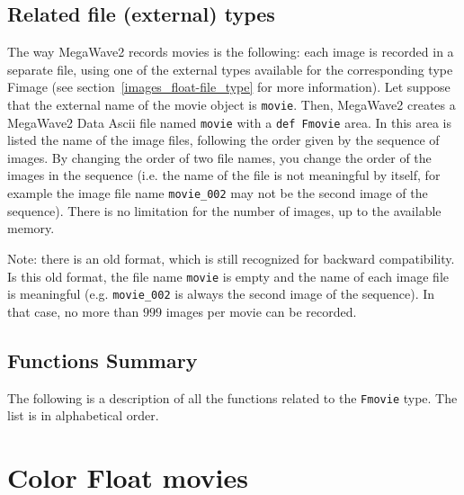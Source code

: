 \subsection{Related file (external) types}
\label{movies_float-file_type}

The way MegaWave2 records movies is the following:
each image is recorded in a separate file, using one of the external types available for the corresponding type Fimage (see section~\ref{images_float-file_type} for more information).
Let suppose that the external name of the movie object is \verb+movie+.
Then, MegaWave2 creates a MegaWave2 Data Ascii file named \verb+movie+ with a \verb+def Fmovie+ area.
In this area is listed the name of the image files, following the order given by the sequence of images.
By changing the order of two file names, you change the order of the images in the sequence (i.e. the name of
the file is not meaningful by itself, for example the image file name \verb+movie_002+ may not be the second
image of the sequence).
There is no limitation for the number of images, up to the available memory.

Note: there is an old format, which is still recognized for backward compatibility. 
Is this old format, the file name \verb+movie+ is empty and the name of each image file is meaningful
(e.g. \verb+movie_002+ is always the second image of the sequence).
In that case, no more than $999$ images per movie can be recorded.

\subsection{Functions Summary}
\label{movies_float-movies_function}

The following is a description of all the functions related to 
the \verb+Fmovie+ type. The list is in alphabetical order.

\newpage %



\section{Color Float movies}


